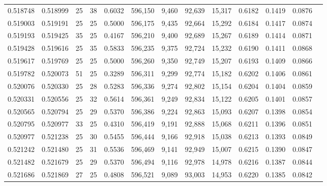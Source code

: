 \begin{tabular}{rrrrrrrrrrrrr}
0.518748 & 0.518999 &    25 &  38 &                                     0.6032 & 596,150 &   9,460 &  92,639 &  15,317 & 0.6182 & 0.1419 & 0.0876 \\
0.519003 & 0.519191 &    25 &  25 &                                     0.5000 & 596,175 &   9,435 &  92,664 &  15,292 & 0.6184 & 0.1417 & 0.0874 \\
0.519193 & 0.519425 &    35 &  25 &                                     0.4167 & 596,210 &   9,400 &  92,689 &  15,267 & 0.6189 & 0.1414 & 0.0871 \\
0.519428 & 0.519616 &    25 &  35 &                                     0.5833 & 596,235 &   9,375 &  92,724 &  15,232 & 0.6190 & 0.1411 & 0.0868 \\
0.519617 & 0.519769 &    25 &  25 &                                     0.5000 & 596,260 &   9,350 &  92,749 &  15,207 & 0.6193 & 0.1409 & 0.0866 \\
0.519782 & 0.520073 &    51 &  25 &                                     0.3289 & 596,311 &   9,299 &  92,774 &  15,182 & 0.6202 & 0.1406 & 0.0861 \\
0.520076 & 0.520330 &    25 &  28 &                                     0.5283 & 596,336 &   9,274 &  92,802 &  15,154 & 0.6204 & 0.1404 & 0.0859 \\
0.520331 & 0.520556 &    25 &  32 &                                     0.5614 & 596,361 &   9,249 &  92,834 &  15,122 & 0.6205 & 0.1401 & 0.0857 \\
0.520565 & 0.520794 &    25 &  29 &                                     0.5370 & 596,386 &   9,224 &  92,863 &  15,093 & 0.6207 & 0.1398 & 0.0854 \\
0.520795 & 0.520977 &    33 &  25 &                                     0.4310 & 596,419 &   9,191 &  92,888 &  15,068 & 0.6211 & 0.1396 & 0.0851 \\
0.520977 & 0.521238 &    25 &  30 &                                     0.5455 & 596,444 &   9,166 &  92,918 &  15,038 & 0.6213 & 0.1393 & 0.0849 \\
0.521242 & 0.521480 &    25 &  31 &                                     0.5536 & 596,469 &   9,141 &  92,949 &  15,007 & 0.6215 & 0.1390 & 0.0847 \\
0.521482 & 0.521679 &    25 &  29 &                                     0.5370 & 596,494 &   9,116 &  92,978 &  14,978 & 0.6216 & 0.1387 & 0.0844 \\
0.521686 & 0.521869 &    27 &  25 &                                     0.4808 & 596,521 &   9,089 &  93,003 &  14,953 & 0.6220 & 0.1385 & 0.0842 \\

\end{tabular}
